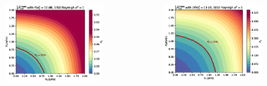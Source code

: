 \documentclass[xcolor=dvipsnames,aspectratio=169]{beamer}
\begin{document}
{\begin{columns}
 \begin{column}{4cm}
    \begin{figure}
        \centering
        \includegraphics[width=\columnwidth]{paretoPoTDMA}   
    \end{figure}
 \end{column}
 
 \begin{column}{4cm}
    \begin{figure}
        \centering
        \includegraphics[width=\columnwidth]{paretoPoFDMA}   
    \end{figure}
 \end{column}
\end{columns}
\pagebreak

}
\end{document}
